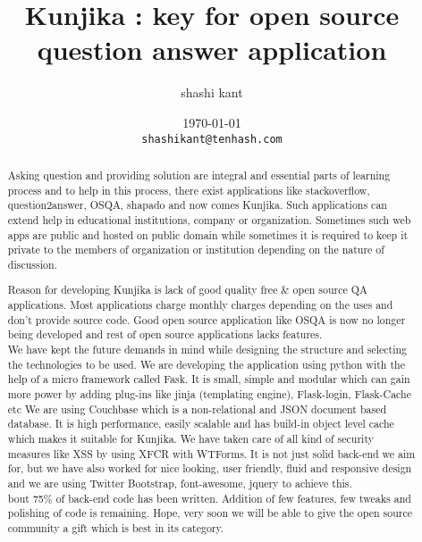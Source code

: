 \documentclass[a4paper,10pt]{report}
\title{Kunjika : key for open source question answer application}
\author{shashi kant}
\date{\today \\ \texttt{shashikant@tenhash.com}}
\begin{document}
\maketitle
\begin{abstract}
Asking question and providing solution are integral and essential parts of learning process and to help in this process, there exist applications like stackoverflow, question2answer, OSQA, shapado and now comes Kunjika. Such applications can extend help in educational institutions, company or organization. Sometimes such web apps are public and hosted on public domain while sometimes it is required to keep it private to the members of organization or institution depending on the nature of discussion.

Reason for developing Kunjika is lack of good quality free \& open source QA applications. Most applications charge monthly charges depending on the uses and don't provide source code. Good open source application like OSQA is now no longer being developed and rest of open source applications lacks features.
\\
We have kept the future demands in mind while designing the structure and selecting the technologies to be used. We are developing the application using python with the help of a micro framework called Fask. It is small, simple and modular which can gain more power by adding plug-ins like jinja (templating engine), Flask-login, Flask-Cache etc  We are using Couchbase which is a non-relational and JSON document based database. It is high performance, easily scalable and has build-in object level cache which makes it suitable for Kunjika. We have taken care of all kind of security measures like XSS by using XFCR with WTForms. It is not just solid back-end we aim for, but we have also worked for nice looking, user friendly, fluid and responsive design and we are using Twitter Bootstrap, font-awesome, jquery to achieve this.
\\
bout 75\% of back-end code has been written. Addition of few features, few tweaks and polishing of code is remaining. Hope, very soon we will be able to give the open source community a gift which is best in its category.
\end{abstract}
\end{document}
